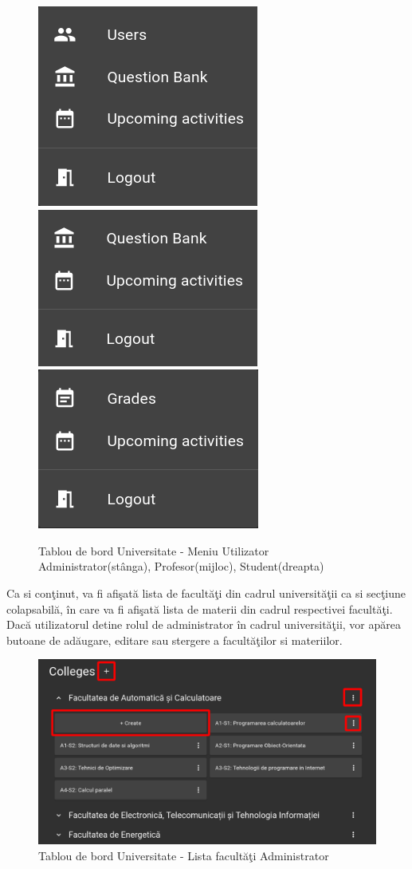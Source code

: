 \documentclass[12pt, a4paper, oneside, romanian]{teza-upb}
\begin{document}
\begin{figure}[H]
\centering
\includegraphics*[width=0.32\columnwidth]{tablou-de-bord-universitate-meniu-utilizator-administrator}
\includegraphics*[width=0.32\columnwidth]{tablou-de-bord-universitate-meniu-utilizator-profesor}
\includegraphics*[width=0.32\columnwidth]{tablou-de-bord-universitate-meniu-utilizator-student}
\caption{Tablou de bord Universitate - Meniu Utilizator Administrator(stânga), Profesor(mijloc), Student(dreapta)}
\label{tablou-de-bord-universitate-meniu-utilizator-administrator}
\end{figure}

Ca si conţinut, va fi afişată lista de facultăţi din cadrul universităţii ca si secţiune colapsabilă, în care va fi afişată lista de materii din cadrul respectivei facultăţi. Dacă utilizatorul detine rolul de administrator în cadrul universităţii, vor apărea butoane de adăugare, editare sau stergere a facultăţilor si materiilor.

\begin{figure}[H]
\centering
\includegraphics*[width=\columnwidth]{tablou-de-bord-universitate-lista-facultati-administrator}
\caption{Tablou de bord Universitate - Lista facultăţi Administrator}
\label{tablou-de-bord-universitate-lista-facultati-administrator}
\end{figure}
\end{document}
